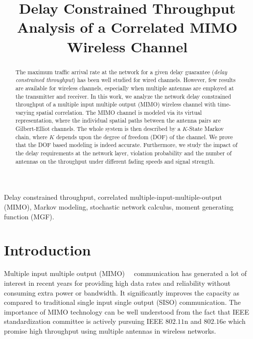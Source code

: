 \documentclass[10pt,conference]{IEEEtran}
\begin{document}
\title{Delay Constrained Throughput Analysis of a Correlated MIMO Wireless Channel}




\author{       

}




\maketitle




\begin{abstract}
The maximum traffic arrival rate at the network for a given delay guarantee (\emph{delay constrained throughput}) has been well studied for wired channels.
However, few results are available for wireless channels, especially when multiple antennas are employed at the transmitter and receiver.
In this work, we analyze the network delay constrained throughput of a multiple input multiple output (MIMO) wireless channel with time-varying spatial correlation.
The MIMO channel is modeled via its virtual representation, where the
individual spatial paths between the antenna pairs are Gilbert-Elliot channels.  The whole system is then described by a $K$-State Markov chain, where $K$ depends upon the degree of freedom (DOF) of the channel.
We prove that the DOF based modeling is indeed accurate.
Furthermore, we study the impact of the delay requirements at the network layer, violation probability and the number of antennas on the throughput under different fading speeds and signal strength.
\end{abstract}



\begin{IEEEkeywords}
Delay constrained throughput, correlated multiple-input-multiple-output (MIMO), Markov modeling, stochastic network calculus, moment generating function (MGF).
\end{IEEEkeywords}


\section{Introduction}
Multiple input multiple output (MIMO)~\cite{MIMO:Foschini:98:limits}~\cite{MIMO:Teletar99:CapacityOfMultiAntennaGaus} communication has generated a lot of interest in recent years for providing high data rates and reliability without consuming extra power or bandwidth. It significantly improves the capacity as compared to traditional single input single output (SISO) communication.
The importance of MIMO technology can be well understood from the fact that IEEE standardization committee is actively pursuing IEEE $802.11$n and $802.16$e which promise high throughput using multiple antennas in  wireless networks.
\end{document}
